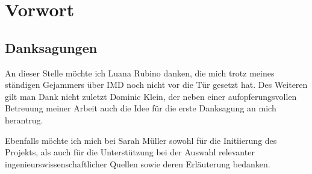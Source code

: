 \chapter{Vorwort}



\newpage
\section*{Danksagungen}
An dieser Stelle möchte ich Luana Rubino danken, die mich trotz meines ständigen Gejammers über
IMD noch nicht vor die Tür gesetzt hat. Des Weiteren gilt man Dank nicht zuletzt Dominic Klein,
der neben einer aufopferungsvollen Betreuung meiner Arbeit auch die Idee für die erste Danksagung
an mich herantrug.

Ebenfalls möchte ich mich bei Sarah Müller sowohl für die Initiierung des Projekts, als auch für
die Unterstützung bei der Auswahl relevanter ingenieurswissenschaftlicher Quellen sowie deren
Erläuterung bedanken.
